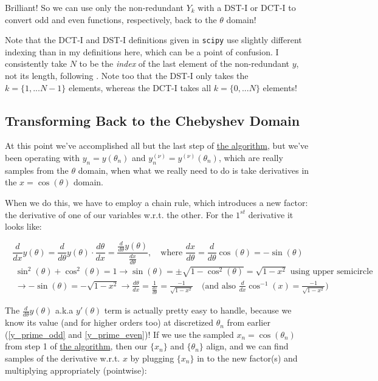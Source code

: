 \documentclass[10pt]{article}
\begin{document}
Brilliant! So we can use only the non-redundant $Y_k$ with a DST-I or DCT-I to convert odd and even functions, respectively, back to the $\theta$ domain!

Note that the DCT-I and DST-I definitions given in \texttt{scipy}\cite{dct}\cite{dst} use slightly different indexing than in my definitions here, which can be a point of confusion. I consistently take $N$ to be the \textit{index} of the last element of the non-redundant $y$, not its length, following \cite{trefethen}. Note too that the DST-I only takes the $k = \{1, ... N-1\}$ elements, whereas the DCT-I takes all $k = \{0, ... N\}$ elements!

\subsection{Transforming Back to the Chebyshev Domain}

At this point we've accomplished all but the last step of \hyperref[algo]{the algorithm}, but we've been operating with $y_n = y(\theta_n)$ and $y_n^{(\nu)} = y^{(\nu)}(\theta_n)$, which are really samples from the $\theta$ domain, when what we really need to do is take derivatives in the $x = \cos(\theta)$ domain.

When we do this, we have to employ a chain rule, which introduces a new factor: the derivative of one of our variables w.r.t. the other. For the $1^{st}$ derivative it looks like:

$$\frac{d}{dx} y(\theta) = \frac{d}{d\theta} y(\theta) \cdot \frac{d\theta}{dx} = \frac{\frac{d}{d\theta} y(\theta)}{\frac{dx}{d\theta}}, \quad \text{where } \frac{dx}{d\theta} = \frac{d}{d\theta} \cos(\theta) = -\sin(\theta)$$
\begin{align*}
	& \sin^2(\theta) + \cos^2(\theta) = 1 \longrightarrow \sin(\theta) = \pm \sqrt{1-\cos^2(\theta)} = \sqrt{1 - x^2} \text{ using upper semicircle}\\
	& \longrightarrow -\sin(\theta) = -\sqrt{1 - x^2} \longrightarrow \frac{d\theta}{dx} = \frac{1}{\frac{dx}{d\theta}} = \frac{-1}{\sqrt{1 - x^2}} \quad \Big(\text{and also } \frac{d}{dx} \cos^{-1}(x) = \frac{-1}{\sqrt{1 - x^2}} \Big)
\end{align*}

The $\frac{d}{d\theta} y(\theta)$ a.k.a $y'(\theta)$ term is actually pretty easy to handle, because we know its value (and for higher orders too) at discretized $\theta_n$ from earlier (\autoref{y_prime_odd} and \autoref{y_prime_even})! If we use the sampled $x_n = \cos(\theta_n)$ from step 1 of \hyperref[algo]{the algorithm}, then our $\{x_n\}$ and $\{\theta_n\}$ align, and we can find samples of the derivative w.r.t. $x$ by plugging $\{x_n\}$ in to the new factor(s) and multiplying appropriately (pointwise):
\end{document}
